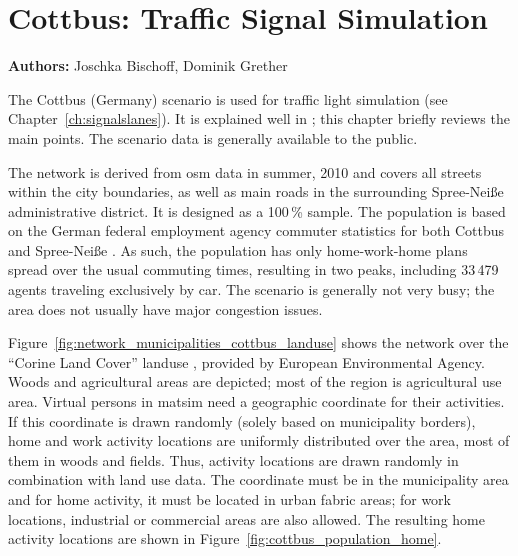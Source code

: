 \chapter{Cottbus: Traffic Signal Simulation}
\label{ch:cottbus} \hfill \textbf{Authors:} Joschka Bischoff, Dominik Grether 

The Cottbus (Germany) scenario 
is used for traffic light simulation (see Chapter~\ref{ch:signalslanes}). 
It is explained well in \citet[][pp.~87]{Grether_PhDThesis_2014}; this chapter briefly reviews the main points. 
The scenario data is generally available to the public.

The network is derived from \gls{osm} data in summer, 2010 \citep{Bischoff2010BaSylvia} and 
covers all streets within the city boundaries, as well as main roads in the surrounding Spree-Neiße administrative district.  
It is designed as a 100\,\% sample. 
The population is based on the German federal employment agency commuter statistics for both Cottbus and Spree-Neiße \citep{WiethoelterBogaiCarstensen2010IABPendlerberichtBB}. 
As such, the population has only home-work-home plans spread over the usual commuting times, resulting in two peaks, including 
33\,479 agents traveling exclusively by car. 
The scenario is generally not very busy; the area does not usually have major congestion issues.

Figure~\ref{fig:network_municipalities_cottbus_landuse} shows the network over the 
``Corine Land Cover'' landuse \citep{CorineLandCover2006Data}, provided by European Environmental Agency. 
Woods and agricultural areas are depicted; most of the region is agricultural use area.  
Virtual persons in \gls{matsim} need a geographic coordinate for their activities. 
If this coordinate is drawn randomly (solely based on municipality borders), home and work activity locations are uniformly distributed over  the area, \ie most of them in woods and fields. 
Thus, activity locations are drawn randomly in combination with land use data. 
The coordinate must be in the municipality area and for home activity, it must be located in urban fabric areas; for work locations, industrial or commercial areas are also allowed. 
The resulting home activity locations are shown in Figure~\ref{fig:cottbus_population_home}. 

